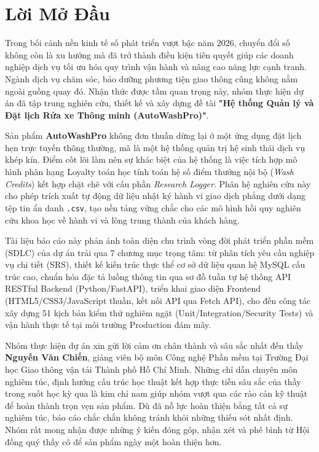 \newpage
{}
\setcounter{page}{1}

\chapter*{Lời Mở Đầu}

Trong bối cảnh nền kinh tế số phát triển vượt bậc năm 2026, chuyển đổi số không còn là xu hướng mà đã trở thành điều kiện tiên quyết giúp các doanh nghiệp dịch vụ tối ưu hóa quy trình vận hành và nâng cao năng lực cạnh tranh. Ngành dịch vụ chăm sóc, bảo dưỡng phương tiện giao thông cũng không nằm ngoài guồng quay đó. Nhận thức được tầm quan trọng này, nhóm thực hiện dự án đã tập trung nghiên cứu, thiết kế và xây dựng đề tài \textbf{"Hệ thống Quản lý và Đặt lịch Rửa xe Thông minh (AutoWashPro)"}.

Sản phẩm \textbf{AutoWashPro} không đơn thuần dừng lại ở một ứng dụng đặt lịch hẹn trực tuyến thông thường, mà là một hệ thống quản trị hệ sinh thái dịch vụ khép kín. Điểm cốt lõi làm nên sự khác biệt của hệ thống là việc tích hợp mô hình phân hạng Loyalty toán học tính toán hệ số điểm thưởng nội bộ (\textit{Wash Credits}) kết hợp chặt chẽ với cấu phần \textit{Research Logger}. Phân hệ nghiên cứu này cho phép trích xuất tự động dữ liệu nhật ký hành vi giao dịch phẳng dưới dạng tệp tin ẩn danh \texttt{.csv}, tạo nền tảng vững chắc cho các mô hình hồi quy nghiên cứu khoa học về hành vi và lòng trung thành của khách hàng.

Tài liệu báo cáo này phản ánh toàn diện chu trình vòng đời phát triển phần mềm (SDLC) của dự án trải qua 7 chương mục trọng tâm: từ phân tích yêu cầu nghiệp vụ chi tiết (SRS), thiết kế kiến trúc thực thể cơ sở dữ liệu quan hệ MySQL cấu trúc cao, chuẩn hóa đặc tả luồng thông tin qua sơ đồ tuần tự hệ thống API RESTful Backend (Python/FastAPI), triển khai giao diện Frontend (HTML5/CSS3/JavaScript thuần, kết nối API qua Fetch API), cho đến công tác xây dựng 51 kịch bản kiểm thử nghiêm ngặt (Unit/Integration/Security Tests) và vận hành thực tế tại môi trường Production đám mây.

Nhóm thực hiện dự án xin gửi lời cảm ơn chân thành và sâu sắc nhất đến thầy \textbf{Nguyễn Văn Chiến}, giảng viên bộ môn Công nghệ Phần mềm tại Trường Đại học Giao thông vận tải Thành phố Hồ Chí Minh. Những chỉ dẫn chuyên môn nghiêm túc, định hướng cấu trúc học thuật kết hợp thực tiễn sâu sắc của thầy trong suốt học kỳ qua là kim chỉ nam giúp nhóm vượt qua các rào cản kỹ thuật để hoàn thành trọn vẹn sản phẩm. Dù đã nỗ lực hoàn thiện bằng tất cả sự nghiêm túc, báo cáo chắc chắn không tránh khỏi những thiếu sót nhất định. Nhóm rất mong nhận được những ý kiến đóng góp, nhận xét và phê bình từ Hội đồng quý thầy cô để sản phẩm ngày một hoàn thiện hơn.

